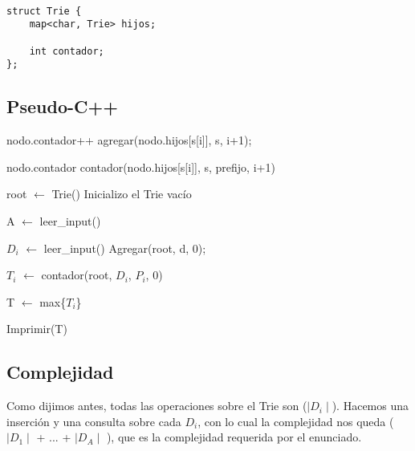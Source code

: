 
\begin{lstlisting}
	
struct Trie {
	map<char, Trie> hijos;
	
	int contador;
};

\end{lstlisting}

\subsection{Pseudo-C++}

\begin{algorithmic}
	
		\State nodo.contador++
			\State \Return
		\Else
			\State agregar(nodo.hijos[s[i]], s, i+1);
		\EndIf

	\EndFunction
	
	\vspace{1.5em}

			\State \Return nodo.contador
		\Else
			\State \Return contador(nodo.hijos[s[i]], s, prefijo, i+1)
		\EndIf
	\EndFunction

	\vspace{1.5em}

		\State root $\gets$ Trie() \Comment Inicializo el Trie vacío

		\State A $\gets$ leer_input()

			\State $D_i$ $\gets$ leer_input()
			\State Agregar(root, d, 0);

		\EndFor

			\State $T_i$ $\gets$ contador(root, $D_i$, $P_i$, 0)
		\EndFor

		\State T $\gets$ max\{$T_i$\}

		\State Imprimir(T)

	\EndFunction





\end{algorithmic}

\subsection{Complejidad}

Como dijimos antes, todas las operaciones sobre el Trie son \bigo($\mid D_i \mid$). Hacemos una inserción y una consulta sobre cada $D_i$, con lo cual la complejidad nos queda
\bigo($\mid D_1 \mid$ + ... + $\mid D_A \mid$ ), que es la complejidad requerida por el enunciado. 